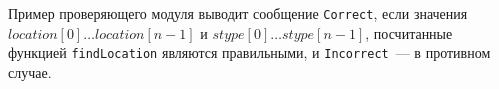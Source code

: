 Пример проверяющего модуля выводит сообщение \texttt{Correct}, если значения $location[0] \ldots location[n - 1]$ и $stype[0] \ldots stype[n - 1]$, посчитанные функцией \texttt{findLocation} являются правильными, и \texttt{Incorrect}~--- в противном случае.